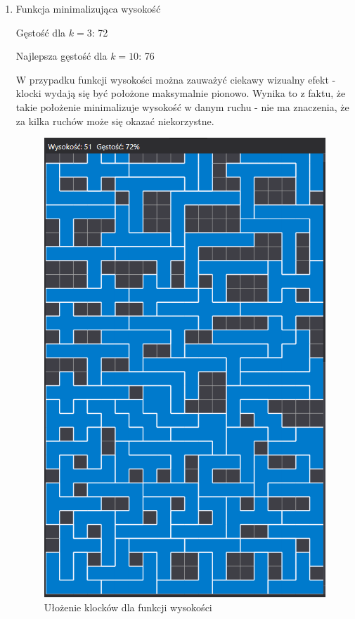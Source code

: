 \documentclass{article}
\begin{document}
\begin{enumerate}
\item Funkcja minimalizująca wysokość

Gęstość dla $k=3$: 72

Najlepsza gęstość dla $k=10$: 76

W przypadku funkcji wysokości można zauważyć ciekawy wizualny efekt - klocki wydają się być położone maksymalnie pionowo.
Wynika to z faktu, że takie położenie minimalizuje wysokość w danym ruchu - nie ma znaczenia, że za kilka ruchów może się okazać niekorzystne.

\begin{figure}[H]
\includegraphics[width=\textwidth]{wysokosc.PNG}
\caption{Ułożenie klocków dla funkcji wysokości}
\end{figure}


\end{enumerate}
\end{document}
